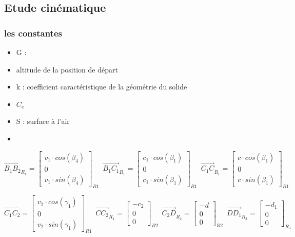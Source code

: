\documentclass[12pt,a4paper]{article}
\begin{document}
\subsection{Etude cinématique}


\subsubsection{les constantes}

\begin{itemize}
	\item G : 
	\item altitude de la position de départ
	\item k : coefficient caractéristique de la géométrie du solide
	\item $C_x$
	\item S : surface à l'air
	\item 
\end{itemize}


\begin{equation}
	\vec{B_1 B_2}_{R_{1}}=
	\begin{bmatrix}
		v_1\cdot cos(\beta_4) \\
		0\\
		v_1\cdot sin(\beta_4)
	\end{bmatrix}_{R1} \enspace
	\vec{B_1 C_1}_{R_{1}}=
	\begin{bmatrix}
		c_1\cdot cos(\beta_1) \\
		0\\
		c_1\cdot sin(\beta_1)
	\end{bmatrix}_{R1} \enspace
	\vec{C_1 C}_{R_{1}}=
	\begin{bmatrix}
		c\cdot cos(\beta_1) \\
		0\\
		c\cdot sin(\beta_1)
	\end{bmatrix}_{R1} \enspace
\end{equation}

\begin{equation}
	\vec{C_1 C_2}=
	\begin{bmatrix}
		v_2\cdot cos(\gamma_1) \\
		0\\
		v_2 \cdot sin(\gamma_1)
	\end{bmatrix}_{R1} \enspace
	\vec{C C_2}_{R_{1}}=
	\begin{bmatrix}
		-c_2\\
		0\\
		0
	\end{bmatrix}_{R2} \enspace
	\vec{C_2 D}_{R_2}=
	\begin{bmatrix}
		-d\\
		0\\
		0
	\end{bmatrix}_{R2} \enspace
	\vec{D D_1}_{R_3}=
	\begin{bmatrix}
		- d_1\\
		0\\
		0
	\end{bmatrix}_{R_3} \enspace
\end{equation}
\end{document}
